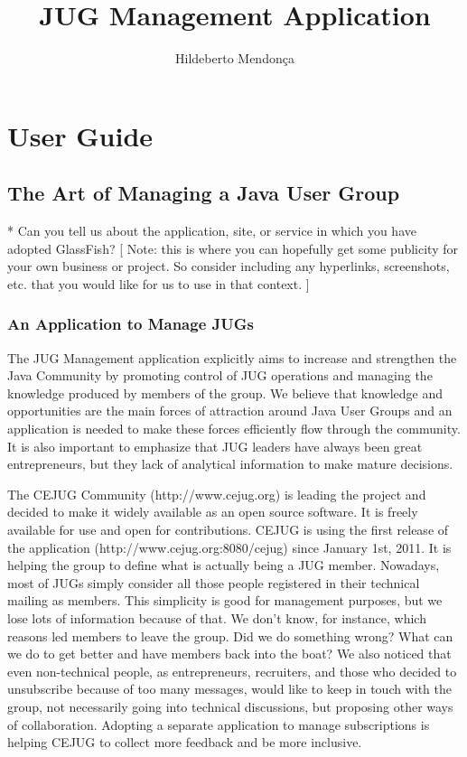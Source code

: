\documentclass[10pt,a4paper]{report}
\author{Hildeberto Mendon\c{c}a}
\title{JUG Management Application}
\begin{document}
\maketitle
\tableofcontents
\part{User Guide}
\chapter{The Art of Managing a Java User Group}

* Can you tell us about the application, site, or service in which you have
  adopted GlassFish?
   [ Note: this is where you can hopefully get some publicity for your
     own business or project.  So consider including any hyperlinks,
     screenshots, etc. that you would like for us to use in that context. ]

\section{An Application to Manage JUGs}

The JUG Management application explicitly aims to increase and strengthen the Java Community by promoting control of JUG operations and managing the knowledge produced by members of the group. We believe that knowledge and opportunities are the main forces of attraction around Java User Groups and an application is needed to make these forces efficiently flow through the community. It is also important to emphasize that JUG leaders have always been great entrepreneurs, but they lack of analytical information to make mature decisions.

The CEJUG Community (http://www.cejug.org) is leading the project and decided to make it widely available as an open source software. It is freely available for use and open for contributions. CEJUG is using the first release of the application (http://www.cejug.org:8080/cejug) since January 1st, 2011. It is helping the group to define what is actually being a JUG member. Nowadays, most of JUGs simply consider all those people registered in their technical mailing as members. This simplicity is good for management purposes, but we lose lots of information because of that. We don't know, for instance, which reasons led members to leave the group. Did we do something wrong? What can we do to get better and have members back into the boat? We also noticed that even non-technical people, as entrepreneurs, recruiters, and those who decided to unsubscribe because of too many messages, would like to keep in touch with the group, not necessarily going into technical discussions, but proposing other ways of collaboration. Adopting a separate application to manage subscriptions is helping CEJUG to collect more feedback and be more inclusive.
\end{document}

